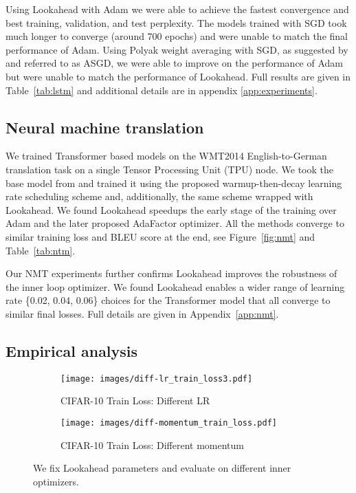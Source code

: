 \documentclass{article}
\begin{document}
Using Lookahead with Adam we were able to achieve the fastest convergence and best training, validation, and test perplexity. The models trained with SGD took much longer to converge (around 700 epochs) and were unable to match the final performance of Adam. Using Polyak weight averaging \citep{polyak1992acceleration} with SGD, as suggested by \citet{merity2017regularizing} and referred to as ASGD, we were able to improve on the performance of Adam but were unable to match the performance of Lookahead.  Full results are given in Table~\ref{tab:lstm} and additional details are in appendix \ref{app:experiments}.
 \subsection{Neural machine translation}
\label{sec:nmt}

We trained Transformer based models \citep{vaswani2017attention} on the WMT2014 English-to-German translation task on a single Tensor Processing Unit (TPU) node. We took the base model from \citet{vaswani2017attention} and trained it using the proposed warmup-then-decay learning rate scheduling scheme and, additionally, the same scheme wrapped with Lookahead. We found Lookahead speedups the early stage of the training over Adam and the later proposed AdaFactor \citep{adafactor} optimizer. All the methods converge to similar training loss and BLEU score at the end, see Figure~\ref{fig:nmt} and Table~\ref{tab:ntm}. 

Our NMT experiments further confirms Lookahead improves the robustness of the inner loop optimizer. We found Lookahead enables a wider range of learning rate \{0.02, 0.04, 0.06\} choices for the Transformer model that all converge to similar final losses. Full details are given in Appendix~\ref{app:nmt}.
\subsection{Empirical analysis}
\label{sec:empirical_analysis}

\begin{figure*}
        \centering
        \begin{subfigure}[b]{0.475\textwidth}
            \centering
            \texttt{[image: images/diff-lr\_train\_loss3.pdf]}
            \caption[Network2]            {{\small CIFAR-10 Train Loss: Different LR}}    
                    \end{subfigure}
        \hfill
        \begin{subfigure}[b]{0.475\textwidth}  
            \centering 
            \texttt{[image: images/diff-momentum\_train\_loss.pdf]}
            \caption[]            {{\small CIFAR-10 Train Loss: Different momentum}}    
                    \end{subfigure}
    \caption{We fix Lookahead parameters and evaluate on different inner optimizers.}
    \label{fig:robust-lr-momentum}
\end{figure*}
\end{document}
